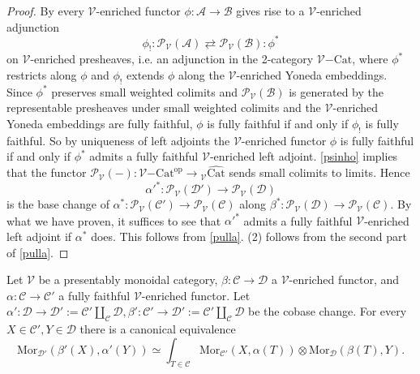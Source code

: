 \documentclass[10pt,oneside]{article}
\numberwithin{equation}{section} %
\numberwithin{figure}{section} %
\theoremstyle{plain}
\theoremstyle{definition}
\newcommand{\mA}{{\mathcal A}}
\newcommand{\mB}{{\mathcal B}}
\newcommand{\mC}{{\mathcal C}}
\newcommand{\mD}{{\mathcal D}}
\newcommand{\mP}{{\mathcal P}}
\newcommand{\mV}{{\mathcal V}}
\newcommand{\op}{\mathrm{op}}
\newcommand{\ot}{\otimes}
\newcommand{\Cat}{\mathrm{Cat}}
\newcommand{\Mor}{{\mathrm{Mor}}}
\begin{document}
\begin{proof}

By \cite[Corollary 1.8.]{heine2024bienriched} every $\mV$-enriched functor $\phi: \mA \to \mB$ 
gives rise to a $\mV$-enriched adjunction
$$\phi_! : \mP_\mV(\mA) \rightleftarrows \mP_\mV(\mB) : \phi^* $$ on $\mV$-enriched presheaves, i.e. an adjunction in the 2-category ${\mV\mathrm{-}\Cat}$, where $\phi^*$ restricts along $\phi$ and
$\phi_!$ extends $\phi$ along the $\mV$-enriched Yoneda embeddings.
Since $\phi^* $ preserves small weighted colimits and
$\mP_\mV(\mB)$ is generated by the representable presheaves 
under small weighted colimits and the $\mV$-enriched Yoneda embeddings are fully faithful, $\phi$ is fully faithful
if and only if $\phi_!$ is fully faithful.
So by uniqueness of left adjoints the $\mV$-enriched functor $\phi$ is fully faithful if and only if $\phi^*$ admits a fully faithful $\mV$-enriched left adjoint.
\cref{psinho} implies that the functor $ \mP_\mV(-): {\mV\mathrm{-}\Cat}^\op \to {_\mV\widehat{\Cat}} $ sends small colimits to limits. 
Hence $$\alpha'^* : \mP_\mV(\mD') \to \mP_\mV(\mD) $$ is the base change of $\alpha^* : \mP_\mV(\mC') \to \mP_\mV(\mC)$ along $\beta^*: \mP_\mV(\mD) \to \mP_\mV(\mC)$.
By what we have proven, it suffices to see that $\alpha'^*$ admits a fully faithful $\mV$-enriched left adjoint if $\alpha^*$ does.
This follows from \cref{pulla}.
(2) follows from the second part of \cref{pulla}.
\end{proof}

\begin{proposition}\label{homsus}
Let $\mV$ be a presentably monoidal category,
$\beta: \mC \to \mD$ a $\mV$-enriched functor, and $\alpha: \mC \to \mC'$
a fully faithful $\mV$-enriched functor.
Let $\alpha': \mD \to \mD' := \mC' \coprod_\mC \mD, 
\beta': \mC' \to \mD' := \mC' \coprod_\mC \mD$ be the cobase change.
For every $X \in \mC', Y \in \mD$ 
there is a canonical equivalence
$$ \Mor_{\mD'}(\beta'(X),\alpha'(Y)) \simeq \int_{T \in \mC} \Mor_{\mC'}(X,\alpha(T)) \ot \Mor_{\mD}(\beta(T),Y) . $$ 

\end{proposition}
\end{document}
